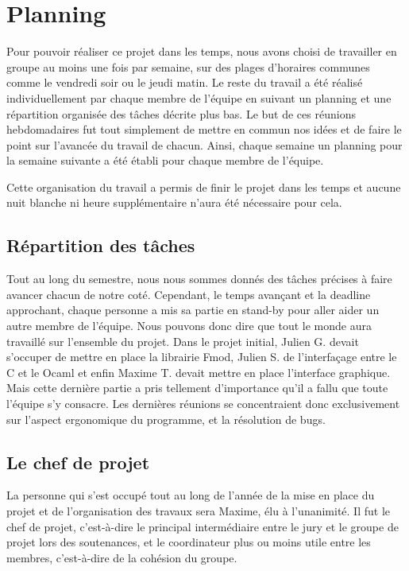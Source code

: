 \documentclass[12pt,a4paper]{report}
\begin{document}
\chapter{Planning}
Pour pouvoir réaliser ce projet dans les temps, nous avons choisi de travailler en groupe au moins une fois par semaine, sur des plages d'horaires communes comme le vendredi soir ou le jeudi matin. Le reste du travail a été réalisé individuellement par chaque membre de l'équipe en suivant un planning et une répartition organisée des tâches décrite plus bas. Le but de ces réunions hebdomadaires fut tout simplement de mettre en commun nos idées et de faire le point sur l'avancée du travail de chacun. Ainsi, chaque semaine un planning pour la semaine suivante a été établi pour chaque membre de l'équipe.

Cette organisation du travail a permis de finir le projet dans les temps et aucune nuit blanche ni heure supplémentaire n'aura été nécessaire pour cela.

\section{Répartition des tâches}

Tout au long du semestre, nous nous sommes donnés des tâches précises à faire avancer chacun de notre coté. Cependant, le temps avançant et la deadline approchant, chaque personne a mis sa partie en stand-by pour aller aider un autre membre de l'équipe. Nous pouvons donc dire que tout le monde aura travaillé sur l'ensemble du projet.
Dans le projet initial, Julien G. devait s'occuper de mettre en place la librairie Fmod, Julien S. de l'interfaçage entre le C et le Ocaml et enfin Maxime T. devait mettre en place l'interface graphique. Mais cette dernière partie a pris tellement d'importance qu'il a fallu que toute l'équipe s'y consacre.
Les dernières réunions se concentraient donc exclusivement sur l'aspect ergonomique du programme, et la résolution de bugs.

\section{Le chef de projet}

La personne qui s'est occupé tout au long de l'année de la mise en place du projet et de l'organisation des travaux sera Maxime, élu à l'unanimité. Il fut le chef de projet, c'est-à-dire le principal intermédiaire entre le jury et le groupe de projet lors des soutenances, et le coordinateur plus ou moins utile entre les membres, c'est-à-dire de la cohésion du groupe.
\end{document}

